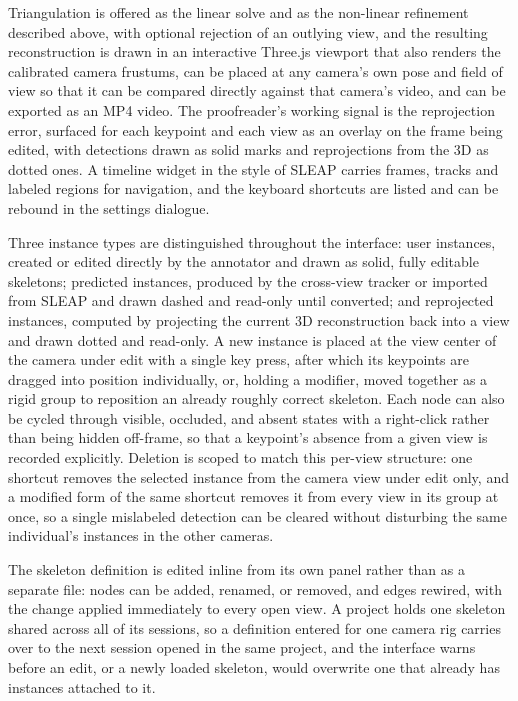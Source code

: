 \documentclass[pdflatex, sn-nature]{sn-jnl}
\theoremstyle{thmstyleone}%
\theoremstyle{thmstyletwo}%
\theoremstyle{thmstylethree}%
\begin{document}
Triangulation is offered as the linear solve and as the non-linear refinement described above, with optional rejection of an outlying view, and the resulting reconstruction is drawn in an interactive Three.js viewport that also renders the calibrated camera frustums, can be placed at any camera's own pose and field of view so that it can be compared directly against that camera's video, and can be exported as an MP4 video. The proofreader's working signal is the reprojection error, surfaced for each keypoint and each view as an overlay on the frame being edited, with detections drawn as solid marks and reprojections from the 3D as dotted ones. A timeline widget in the style of SLEAP carries frames, tracks and labeled regions for navigation, and the keyboard shortcuts are listed and can be rebound in the settings dialogue.

Three instance types are distinguished throughout the interface: user instances, created or edited directly by the annotator and drawn as solid, fully editable skeletons; predicted instances, produced by the cross-view tracker or imported from SLEAP and drawn dashed and read-only until converted; and reprojected instances, computed by projecting the current 3D reconstruction back into a view and drawn dotted and read-only. A new instance is placed at the view center of the camera under edit with a single key press, after which its keypoints are dragged into position individually, or, holding a modifier, moved together as a rigid group to reposition an already roughly correct skeleton. Each node can also be cycled through visible, occluded, and absent states with a right-click rather than being hidden off-frame, so that a keypoint's absence from a given view is recorded explicitly. Deletion is scoped to match this per-view structure: one shortcut removes the selected instance from the camera view under edit only, and a modified form of the same shortcut removes it from every view in its group at once, so a single mislabeled detection can be cleared without disturbing the same individual's instances in the other cameras.

The skeleton definition is edited inline from its own panel rather than as a separate file: nodes can be added, renamed, or removed, and edges rewired, with the change applied immediately to every open view. A project holds one skeleton shared across all of its sessions, so a definition entered for one camera rig carries over to the next session opened in the same project, and the interface warns before an edit, or a newly loaded skeleton, would overwrite one that already has instances attached to it.
\end{document}
